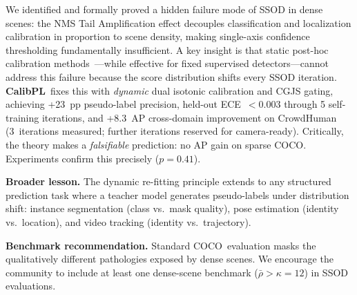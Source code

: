 \documentclass[10pt,twocolumn,letterpaper]{article}
\newcommand{\method}{\textbf{CalibPL}\xspace}
\newcommand{\coco}{\textsc{COCO}\xspace}
\begin{document}
We identified and formally proved a hidden failure mode of SSOD in dense scenes:
the NMS Tail Amplification effect decouples classification and localization
calibration in proportion to scene density, making single-axis confidence
thresholding fundamentally insufficient. A key insight is that static post-hoc
calibration methods~\cite{kuzucu2024calibration}---while effective for fixed
supervised detectors---cannot address this failure because the score distribution
shifts every SSOD iteration. \method\ fixes this with \emph{dynamic} dual
isotonic calibration and CGJS gating, achieving +23~pp pseudo-label precision,
held-out ECE~${<}0.003$ through 5 self-training iterations, and +8.3~AP
cross-domain improvement on CrowdHuman (3~iterations measured; further
iterations reserved for camera-ready). Critically, the theory makes a
\emph{falsifiable} prediction: no AP gain on sparse \coco. Experiments confirm
this precisely ($p{=}0.41$).

\textbf{Broader lesson.}
The dynamic re-fitting principle extends to any structured prediction task where
a teacher model generates pseudo-labels under distribution shift:
instance segmentation (class vs.\ mask quality), pose estimation (identity
vs.\ location), and video tracking (identity vs.\ trajectory).

\textbf{Benchmark recommendation.}
Standard \coco\ evaluation masks the qualitatively different pathologies exposed
by dense scenes. We encourage the community to include at least one dense-scene
benchmark ($\bar{\rho}{>}\kappa{=}12$) in SSOD evaluations.

{\small


}
\end{document}
